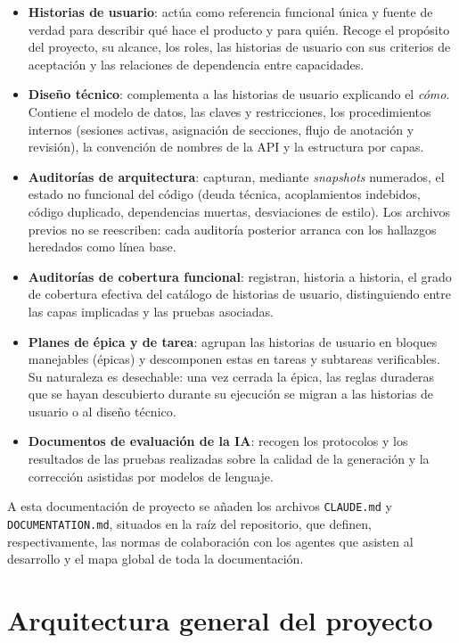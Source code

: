 \begin{itemize}
	\item \textbf{Historias de usuario}: actúa como referencia funcional única y fuente
	      de verdad para describir qué hace el producto y para quién. Recoge el propósito
	      del proyecto, su alcance, los roles, las historias de usuario con sus criterios
	      de aceptación y las relaciones de dependencia entre capacidades.
	\item \textbf{Diseño técnico}: complementa a las historias de usuario explicando el
	      \textit{cómo}. Contiene el modelo de datos, las claves y restricciones, los
	      procedimientos internos (sesiones activas, asignación de secciones, flujo de
	      anotación y revisión), la convención de nombres de la API y la estructura por
	      capas.
	\item \textbf{Auditorías de arquitectura}: capturan, mediante \textit{snapshots}
	      numerados, el estado no funcional del código (deuda técnica, acoplamientos
	      indebidos, código duplicado, dependencias muertas, desviaciones de estilo). Los
	      archivos previos no se reescriben: cada auditoría posterior arranca con los
	      hallazgos heredados como línea base.
	\item \textbf{Auditorías de cobertura funcional}: registran, historia a historia, el
	      grado de cobertura efectiva del catálogo de historias de usuario, distinguiendo
	      entre las capas implicadas y las pruebas asociadas.
	\item \textbf{Planes de épica y de tarea}: agrupan las historias de usuario en
	      bloques manejables (épicas) y descomponen estas en tareas y subtareas
	      verificables. Su naturaleza es desechable: una vez cerrada la épica, las reglas
	      duraderas que se hayan descubierto durante su ejecución se migran a las
	      historias de usuario o al diseño técnico.
	\item \textbf{Documentos de evaluación de la IA}: recogen los protocolos y los
	      resultados de las pruebas realizadas sobre la calidad de la generación y la
	      corrección asistidas por modelos de lenguaje.
\end{itemize}

A esta documentación de proyecto se añaden los archivos \texttt{CLAUDE.md} y
\texttt{DOCUMENTATION.md}, situados en la raíz del repositorio, que definen,
respectivamente, las normas de colaboración con los agentes que asisten al
desarrollo y el mapa global de toda la documentación.

\section{Arquitectura general del proyecto}

